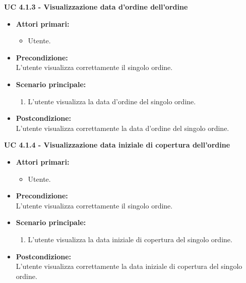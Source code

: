 \vspace{0.4cm}

\newpage

\noindent \textbf{\large UC 4.1.3 - Visualizzazione data d'ordine dell'ordine}
\label{uc:visualizzazione-data-ordine}
\begin{itemize}

	\item \textbf{Attori primari: }
		\begin{itemize}
			\item Utente.
		\end{itemize}

	\item \textbf{Precondizione: }\\[0.3cm]
		L'utente visualizza correttamente il singolo ordine.

	\item \textbf{Scenario principale: }
		\begin{enumerate}
			\item L'utente visualizza la data d'ordine del singolo ordine.
		\end{enumerate}
		

	\item \textbf{Postcondizione: }\\[0.3cm]
		L'utente visualizza correttamente la data d'ordine del singolo ordine.

\end{itemize}

\vspace{0.4cm}

\noindent \textbf{\large UC 4.1.4 - Visualizzazione data iniziale di copertura dell'ordine}
\label{uc:visualizzazione-data-iniziale-copertura}
\begin{itemize}

	\item \textbf{Attori primari: }
		\begin{itemize}
			\item Utente.
		\end{itemize}

	\item \textbf{Precondizione: }\\[0.3cm]
		L'utente visualizza correttamente il singolo ordine.

	\item \textbf{Scenario principale: }
		\begin{enumerate}
			\item L'utente visualizza la data iniziale di copertura del singolo ordine.
		\end{enumerate}
		

	\item \textbf{Postcondizione: }\\[0.3cm]
		L'utente visualizza correttamente la data iniziale di copertura del singolo ordine.

\end{itemize}

